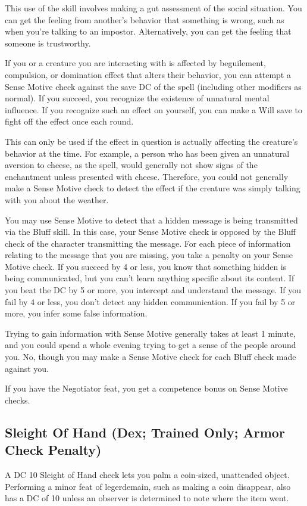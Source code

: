  This use of the skill involves making a gut assessment of the social situation. You can get the feeling from another's behavior that something is wrong, such as when you're talking to an impostor. Alternatively, you can get the feeling that someone is trustworthy.

 If you or a creature you are interacting with is affected by beguilement, compulsion, or domination effect that alters their behavior, you can attempt a Sense Motive check against the save DC of the spell (including other modifiers as normal). If you succeed, you recognize the existence of unnatural mental influence. If you recognize such an effect on yourself, you can make a Will save to fight off the effect once each round.

This can only be used if the effect in question is actually affecting the creature's behavior at the time. For example, a person who has been given an unnatural aversion to cheese, as the  spell, would generally not show signs of the enchantment unless presented with cheese. Therefore, you could not generally make a Sense Motive check to detect the effect if the creature was simply talking with you about the weather.

 You may use Sense Motive to detect that a hidden message is being transmitted via the Bluff skill. In this case, your Sense Motive check is opposed by the Bluff check of the character transmitting the message. For each piece of information relating to the message that you are missing, you take a  penalty on your Sense Motive check. If you succeed by 4 or less, you know that something hidden is being communicated, but you can't learn anything specific about its content. If you beat the DC by 5 or more, you intercept and understand the message. If you fail by 4 or less, you don't detect any hidden communication. If you fail by 5 or more, you infer some false information.

 Trying to gain information with Sense Motive generally takes at least 1 minute, and you could spend a whole evening trying to get a sense of the people around you.
 No, though you may make a Sense Motive check for each Bluff check made against you.
\par If you have the Negotiator feat, you get a  competence bonus on Sense
Motive checks.

\subsection{Sleight Of Hand (Dex; Trained Only; Armor Check Penalty)}
 A DC 10 Sleight of Hand check lets you palm a coin-sized, unattended object. Performing a minor feat of legerdemain, such as making a coin disappear, also has a DC of 10 unless an observer is determined to note where the item went.

